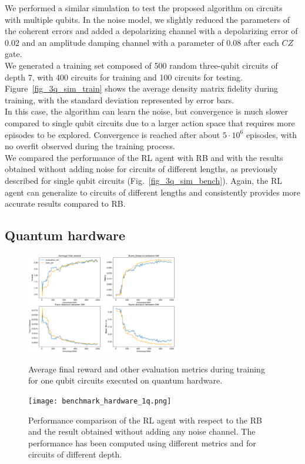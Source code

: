 \documentclass[sn-basic]{sn-jnl} %
\begin{document}
\noindent
We performed a similar simulation to test the proposed algorithm on circuits with multiple qubits. 
In the noise model, we slightly reduced the parameters of the coherent errors and added a depolarizing 
channel with a depolarizing error of $0.02$ and an amplitude damping channel with a parameter of $0.08$ 
after each $CZ$ gate. \\
We generated a training set composed of 500 random three-qubit circuits of depth 7, with 400 circuits 
for training and 100 circuits for testing. Figure~\ref{fig_3q_sim_train} shows the average density matrix 
fidelity during training, with the standard deviation represented by error bars.\\
In this case, the algorithm can learn the noise, but convergence is much slower compared to single qubit 
circuits due to a larger action space that requires more episodes to be explored. Convergence is reached 
after about $5\cdot10^6$ episodes, with no overfit observed during the training process.\\
We compared the performance of the RL agent with RB and with the results obtained without adding noise for 
circuits of different lengths, as previously described for single qubit circuits (Fig.~\ref{fig_3q_sim_bench}). 
Again, the RL agent can generalize to circuits of different lengths and consistently provides more accurate 
results compared to RB.

\subsection{Quantum hardware}\label{sec_hardware}

\begin{figure}
    \centering
    \includegraphics[width=0.6\textwidth]{training_hardware_1q.png}
    \caption{Average final reward and other evaluation metrics during training for one qubit circuits 
    executed on quantum hardware.}\label{fig_1q_hard_train}
    \texttt{[image: benchmark\_hardware\_1q.png]}
    \caption{Performance comparison of the RL agent with respect to the RB and the result obtained 
    without adding any noise channel. The performance has been computed using different metrics and 
    for circuits of different depth.}\label{fig_1q_hard_bench}
\end{figure}
\end{document}
